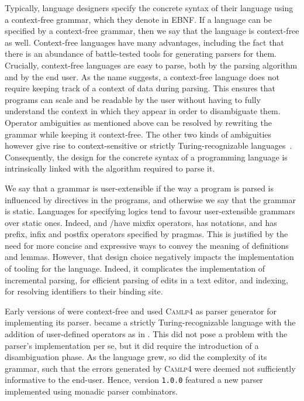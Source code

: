 Typically, language designers specify the concrete syntax of their language using a context-free grammar, which they denote in \ac{EBNF}.
If a language can be specified by a context-free grammar, then we say that the language is context-free as well.
Context-free languages have many advantages, including the fact that there is an abundance of battle-tested tools for generating parsers for them.
Crucially, context-free languages are easy to parse, both by the parsing algorithm and by the end user.
As the name suggests, a context-free language does not require keeping track of a context of data during parsing.
This ensures that programs can scale and be readable by the user without having to fully understand the context in which they appear in order to disambiguate them.
Operator ambiguities as mentioned above can be resolved by rewriting the grammar while keeping it context-free.
The other two kinds of ambiguities however give rise to context-sensitive or strictly Turing-recognizable languages~\cite{chomsky1956three}.
Consequently, the design for the concrete syntax of a programming language is intrinsically linked with the algorithm required to parse it.


We say that a grammar is user-extensible if the way a program is parsed is influenced by directives in the programs, and otherwise we say that the grammar is static.
Languages for specifying logics tend to favour user-extensible grammars over static ones.
Indeed, \Agda and \Isabelle/\HOL have mixfix operators, \Coq has notations, and \Beluga has prefix, infix and postfix operators specified by pragmas.
This is justified by the need for more concise and expressive ways to convey the meaning of definitions and lemmas.
However, that design choice negatively impacts the implementation of tooling for the language.
Indeed, it complicates the implementation of incremental parsing, for efficient parsing of edits in a text editor, and indexing, for resolving identifiers to their binding site.

Early versions of \Beluga were context-free and used \textsc{Camlp4} as parser generator for implementing its parser.
\Beluga became a strictly Turing-recognizable language with the addition of user-defined operators as in \Twelf.
This did not pose a problem with the parser's implementation per se, but it did require the introduction of a disambiguation phase.
As the \Beluga language grew, so did the complexity of its grammar, such that the errors generated by \textsc{Camlp4} were deemed not sufficiently informative to the end-user.
Hence, \Beluga version \texttt{1.0.0} featured a new parser implemented using monadic parser combinators.

